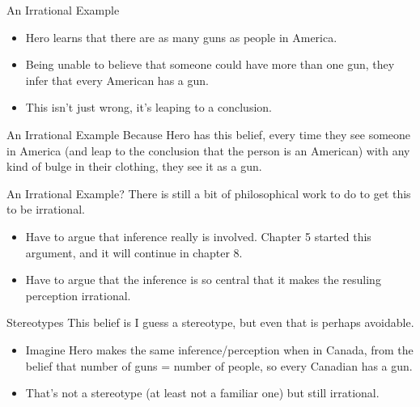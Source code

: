 \documentclass[
  17pt,
  letterpaper,
  ignorenonframetext,
  aspectratio=169,
  xcolor={dvipsnames}]{beamer}
\providecommand{\tightlist}{%
  \setlength{\itemsep}{0pt}\setlength{\parskip}{0pt}}\usepackage{longtable,booktabs,array}
\begin{document}
\begin{frame}{An Irrational Example}
\protect\hypertarget{an-irrational-example}{}
\begin{itemize}[<+->]
\tightlist
\item
  Hero learns that there are as many guns as people in America.
\item
  Being unable to believe that someone could have more than one gun,
  they infer that every American has a gun.
\item
  This isn't just wrong, it's leaping to a conclusion.
\end{itemize}
\end{frame}

\begin{frame}{An Irrational Example}
\protect\hypertarget{an-irrational-example-1}{}
Because Hero has this belief, every time they see someone in America
(and leap to the conclusion that the person is an American) with any
kind of bulge in their clothing, they see it as a gun.
\end{frame}

\begin{frame}{An Irrational Example?}
\protect\hypertarget{an-irrational-example-2}{}
There is still a bit of philosophical work to do to get this to be
irrational.

\begin{itemize}[<+->]
\tightlist
\item
  Have to argue that inference really is involved. Chapter 5 started
  this argument, and it will continue in chapter 8.
\item
  Have to argue that the inference is so central that it makes the
  resuling perception irrational.
\end{itemize}
\end{frame}

\begin{frame}{Stereotypes}
\protect\hypertarget{stereotypes}{}
This belief is I guess a stereotype, but even that is perhaps avoidable.

\begin{itemize}[<+->]
\tightlist
\item
  Imagine Hero makes the same inference/perception when in Canada, from
  the belief that number of guns = number of people, so every Canadian
  has a gun.
\item
  That's not a stereotype (at least not a familiar one) but still
  irrational.
\end{itemize}
\end{frame}
\end{document}
